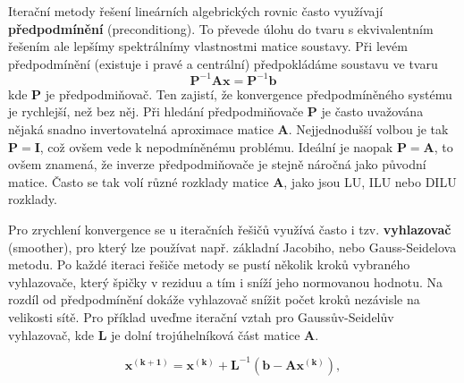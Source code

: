 \documentclass[a4paper,12pt]{report}
\theoremstyle{remark}
\begin{document}

	
		
	Iterační metody řešení lineárních algebrických rovnic často využívají \textbf{předpodmínění} (preconditiong). To převede úlohu do tvaru s ekvivalentním řešením ale lepšímy spektrálnímy vlastnostmi matice soustavy.  Při levém předpodmínění (existuje i pravé a centrální) předpokládáme soustavu ve tvaru
	$$\boldsymbol{P}^{-1}\boldsymbol{A}\boldsymbol{x} =\boldsymbol{P}^{-1}\boldsymbol{b}$$
	kde $\boldsymbol{P}$ je předpodmiňovač. Ten zajistí, že konvergence předpodmíněného systému je rychlejší, než bez něj. Při hledání předpodmiňovače $\boldsymbol{P}$ je často uvažována nějaká snadno invertovatelná aproximace matice $\boldsymbol{A}$. Nejjednodušší volbou je tak $\boldsymbol{P} = \boldsymbol{I}$, což ovšem vede k nepodmíněnému problému. Ideální je naopak $\boldsymbol{P} = \boldsymbol{A}$, to ovšem znamená, že inverze předpodmiňovače je stejně náročná jako původní matice. Často se tak volí různé rozklady matice $\boldsymbol{A}$, jako jsou LU, ILU nebo DILU rozklady.
	
	Pro zrychlení konvergence se u iteračních řešičů využívá často i tzv. \textbf{vyhlazovač} (smoother), pro který lze používat např. základní Jacobiho, nebo Gauss-Seidelova metodu. Po každé iteraci řešiče metody se pustí několik kroků vybraného vyhlazovače, který  špičky v reziduu a tím i sníží jeho normovanou hodnotu. Na rozdíl od předpodmínění dokáže vyhlazovač snížit počet kroků nezávisle na velikosti sítě. Pro příklad uveďme iterační vztah pro Gaussův-Seidelův vyhlazovač, kde $\boldsymbol{L}$ je dolní trojúhelníková část matice $\boldsymbol{A}$.
	
	\begin{equation}
		\boldsymbol{x^{(k+1)}} = \boldsymbol{x^{(k)}}+\boldsymbol{L}^{-1}(\boldsymbol{b} -  \boldsymbol{A}\boldsymbol{x^{(k)}}),
		\label{eq:gs_smoother}
	\end{equation}
\end{document}
